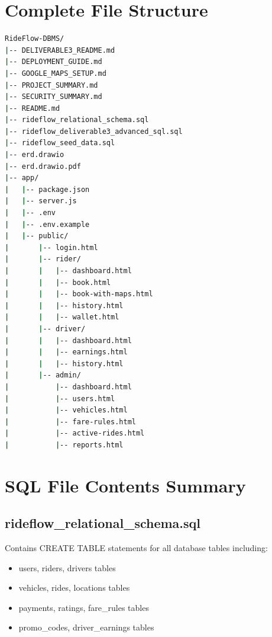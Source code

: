 \documentclass[12pt,a4paper]{report}
\begin{document}
\appendix
\chapter{Complete File Structure}

\begin{lstlisting}[language=bash, basicstyle=\ttfamily\scriptsize]
RideFlow-DBMS/
|-- DELIVERABLE3_README.md
|-- DEPLOYMENT_GUIDE.md
|-- GOOGLE_MAPS_SETUP.md
|-- PROJECT_SUMMARY.md
|-- SECURITY_SUMMARY.md
|-- README.md
|-- rideflow_relational_schema.sql
|-- rideflow_deliverable3_advanced_sql.sql
|-- rideflow_seed_data.sql
|-- erd.drawio
|-- erd.drawio.pdf
|-- app/
|   |-- package.json
|   |-- server.js
|   |-- .env
|   |-- .env.example
|   |-- public/
|       |-- login.html
|       |-- rider/
|       |   |-- dashboard.html
|       |   |-- book.html
|       |   |-- book-with-maps.html
|       |   |-- history.html
|       |   |-- wallet.html
|       |-- driver/
|       |   |-- dashboard.html
|       |   |-- earnings.html
|       |   |-- history.html
|       |-- admin/
|           |-- dashboard.html
|           |-- users.html
|           |-- vehicles.html
|           |-- fare-rules.html
|           |-- active-rides.html
|           |-- reports.html
\end{lstlisting}

\chapter{SQL File Contents Summary}

\section{rideflow\_relational\_schema.sql}
Contains CREATE TABLE statements for all database tables including:
\begin{itemize}
    \item users, riders, drivers tables
    \item vehicles, rides, locations tables
    \item payments, ratings, fare\_rules tables
    \item promo\_codes, driver\_earnings tables
\end{itemize}
\end{document}
